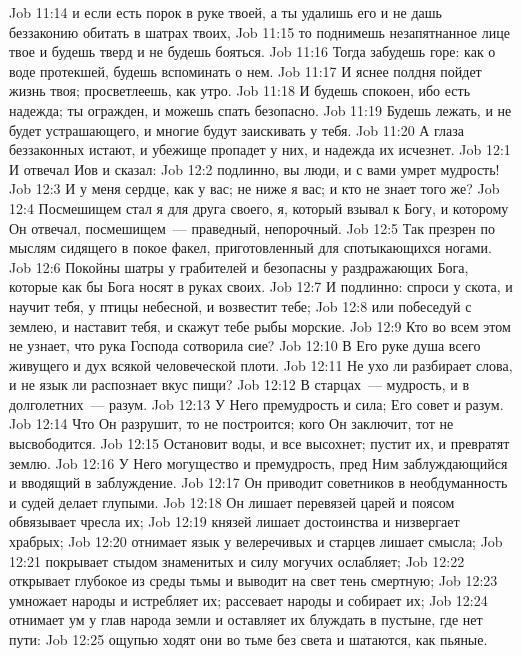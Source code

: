 \vs Job 11:14 и если есть порок в руке твоей, а ты удалишь его и не дашь беззаконию обитать в шатрах твоих,
\vs Job 11:15 то поднимешь незапятнанное лице твое и будешь тверд и не будешь бояться.
\vs Job 11:16 Тогда забудешь горе: как о воде протекшей, будешь вспоминать о нем.
\vs Job 11:17 И яснее полдня пойдет жизнь твоя; просветлеешь, как утро.
\vs Job 11:18 И будешь спокоен, ибо есть надежда; ты огражден, и можешь спать безопасно.
\vs Job 11:19 Будешь лежать, и не будет устрашающего, и многие будут заискивать у тебя.
\vs Job 11:20 А глаза беззаконных истают, и убежище пропадет у них, и надежда их исчезнет.
\vs Job 12:1 И отвечал Иов и сказал:
\vs Job 12:2 подлинно,  вы люди, и с вами умрет мудрость!
\vs Job 12:3 И у меня  сердце, как у вас; не ниже я вас; и кто не знает того же?
\vs Job 12:4 Посмешищем стал я для друга своего, я, который взывал к Богу, и которому Он отвечал, посмешищем~---  праведный, непорочный.
\vs Job 12:5 Так презрен по мыслям сидящего в покое факел, приготовленный для спотыкающихся ногами.
\vs Job 12:6 Покойны шатры у грабителей и безопасны у раздражающих Бога, которые как бы Бога носят в руках своих.
\vs Job 12:7 И подлинно: спроси у скота, и научит тебя, у птицы небесной, и возвестит тебе;
\vs Job 12:8 или побеседуй с землею, и наставит тебя, и скажут тебе рыбы морские.
\vs Job 12:9 Кто во всем этом не узнает, что рука Господа сотворила сие?
\vs Job 12:10 В Его руке душа всего живущего и дух всякой человеческой плоти.
\vs Job 12:11 Не ухо ли разбирает слова, и не язык ли распознает вкус пищи?
\vs Job 12:12 В старцах~--- мудрость, и в долголетних~--- разум.
\vs Job 12:13 У Него премудрость и сила; Его совет и разум.
\vs Job 12:14 Что Он разрушит, то не построится; кого Он заключит, тот не высвободится.
\vs Job 12:15 Остановит воды, и все высохнет; пустит их, и превратят землю.
\vs Job 12:16 У Него могущество и премудрость, пред Ним заблуждающийся и вводящий в заблуждение.
\vs Job 12:17 Он приводит советников в необдуманность и судей делает глупыми.
\vs Job 12:18 Он лишает перевязей царей и поясом обвязывает чресла их;
\vs Job 12:19 князей лишает достоинства и низвергает храбрых;
\vs Job 12:20 отнимает язык у велеречивых и старцев лишает смысла;
\vs Job 12:21 покрывает стыдом знаменитых и силу могучих ослабляет;
\vs Job 12:22 открывает глубокое из среды тьмы и выводит на свет тень смертную;
\vs Job 12:23 умножает народы и истребляет их; рассевает народы и собирает их;
\vs Job 12:24 отнимает ум у глав народа земли и оставляет их блуждать в пустыне, где нет пути:
\vs Job 12:25 ощупью ходят они во тьме без света и шатаются, как пьяные.
